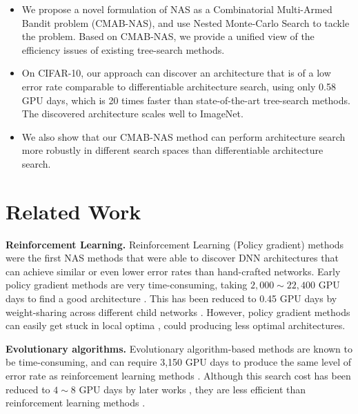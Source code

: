 \documentclass[conference]{IEEEtran}
\begin{document}
\begin{itemize}

    \item We propose a novel formulation of NAS as a Combinatorial Multi-Armed Bandit problem (CMAB-NAS), and use Nested Monte-Carlo Search to tackle the problem.
    Based on CMAB-NAS, we provide a unified view of the efficiency issues of existing tree-search methods.
    
    \item On CIFAR-10, our approach can discover an architecture that is of a low error rate comparable to differentiable architecture search, using only 0.58 GPU days, which is 20 times faster than state-of-the-art tree-search methods. The discovered architecture scales well to ImageNet.
    
    \item We also show that our CMAB-NAS method can perform architecture search more robustly in different search spaces than differentiable architecture search.

\end{itemize}

\section{Related Work}

\noindent\textbf{Reinforcement Learning.} Reinforcement Learning (Policy gradient) methods were the first NAS methods that were able to discover DNN architectures that can achieve similar or even lower error rates than hand-crafted networks.
Early policy gradient methods are very time-consuming, taking $2,000 \sim 22,400$ GPU days to find a good architecture \cite{zoph2017iclr, zoph2018learning}. This has been reduced to 0.45 GPU days by weight-sharing across different child networks \cite{pham2018efficient}. However, policy gradient methods can easily get stuck in local optima \cite{pham2018efficient, sutton2000policy}, could producing less optimal architectures.

\noindent\textbf{Evolutionary algorithms.} Evolutionary algorithm-based methods are known to be time-consuming, and can require 3,150 GPU days to produce the same level of error rate as reinforcement learning methods \cite{real2019regularized}. Although this search cost has been reduced to $ 4 \sim 8$ GPU days by later works \cite{DBLP:conf/gecco/LuWBDDGB19, DBLP:journals/corr/abs-2001-01233}, they are less efficient than reinforcement learning methods \cite{pham2018efficient}.
\end{document}
